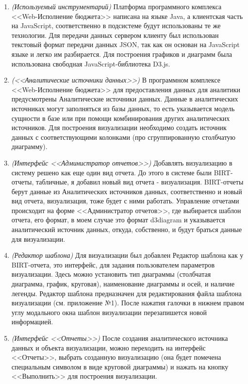 \documentclass[a4paper]{extarticle}
\begin{document}
\begin{enumerate}[label=\textbf{\arabic*})]
\begin{itemize}
        \end{itemize}
    \item \textit{(Используемый инструментарий)} Платформа программного комплекса <<Web-Исполнение бюджета>> написана на языке Java, а клиентская часть на JavaScript, соответственно в подсистеме будут использованы те же технологии. Для передачи данных сервером клиенту был использован текстовый формат передачи данных JSON, так как он основан на JavaScript языке и легко им разбирается. Для построения графиков и диаграмм была использована свободная JavaScript-библиотека D3.js.
    \item \textit{(<<Аналитические источники данных>>)} В программном комплексе <<Web-\-Исполнение бюджета>> для предоставления данных для аналитики предусмотрены Аналитические источники данных. Данные в аналитических источниках могут заполняться из базы данных, то есть указывается модель сущности в базе или при помощи комбинирования других аналитических источников. Для построения визуализации необходимо создать источник данных с соответствующими колонками (про сгруппированную столбчатую диаграмму).
    \item \textit{(Интерфейс <<Администратор отчетов>>)} Добавлять визуализацию в систему решено как еще один вид отчета. До этого в системе были BIRT-отчеты, табличные, я добавил новый вид отчета - визуализация. BIRT-отчеты берут данные из Аналитических источников данных, соответственно и новый вид отчета, визуализация, тоже будет с ними работать. Управление отчетами происходит на форме <<Администратор отчетов>>, где выбирается шаблон отчета, его формат, в моем случае это формат d3diagram и указывается аналитический источник данных, откуда, собственно, и будут браться данные для визуализации.
	\item \textit{(Редактор шаблона)} Для визуализации был добавлен Редактор шаблона как у BIRT-отчета, это интерфейс, для задания пользователем параметров визуализации. Здесь можно установить тип диаграммы (столбчатая диаграмма, график, круговая), наименование диаграммы и осей, и наличие легенды. Редактор шаблона предназначен для редактирования файла шаблона визуализации (см. приложение №1). После нажатия галочки в нижнем правом углу модального окна шаблон визуализации перезапишется новой информацией.
    \item \textit{(Интерфейс <<Отчеты>>)} После создания аналитического источника данных и объекта визуализации, можно переходить на интерфейс <<Отчеты>>, выбрать созданную визуализацию (она будет помечена специальным символом в виде круговой диаграммы) и нажать на кнопку <<Выполнить>> для построения визуализации.

\end{enumerate}
\end{document}
